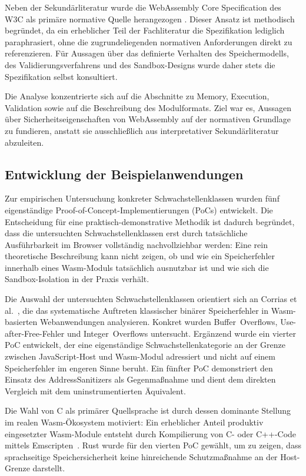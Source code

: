 Neben der Sekundärliteratur wurde die WebAssembly Core Specification des W3C als primäre normative Quelle herangezogen \cite{wasmcoreW3C}. Dieser Ansatz ist methodisch begründet, da ein erheblicher Teil der Fachliteratur die Spezifikation lediglich paraphrasiert, ohne die zugrundeliegenden normativen Anforderungen direkt zu referenzieren. Für Aussagen über das definierte Verhalten des Speichermodells, des Validierungsverfahrens und des Sandbox-Designs wurde daher stets die Spezifikation selbst konsultiert.

Die Analyse konzentrierte sich auf die Abschnitte zu Memory, Execution, Validation sowie auf die Beschreibung des Modulformats. Ziel war es, Aussagen über Sicherheitseigenschaften von WebAssembly auf der normativen Grundlage zu fundieren, anstatt sie ausschließlich aus interpretativer Sekundärliteratur abzuleiten.

\subsection{Entwicklung der Beispielanwendungen}

Zur empirischen Untersuchung konkreter Schwachstellenklassen wurden fünf eigenständige Proof-of-Concept-Implementierungen (PoCs) entwickelt. Die Entscheidung für eine praktisch-demonstrative Methodik ist dadurch begründet, dass die untersuchten Schwachstellenklassen erst durch tatsächliche Ausführbarkeit im Browser vollständig nachvollziehbar werden: Eine rein theoretische Beschreibung kann nicht zeigen, ob und wie ein Speicherfehler innerhalb eines Wasm-Moduls tatsächlich ausnutzbar ist und wie sich die Sandbox-Isolation in der Praxis verhält.

Die Auswahl der untersuchten Schwachstellenklassen orientiert sich an Corrias et al.~\cite{corrias2026analysis}, die das systematische Auftreten klassischer binärer Speicherfehler in Wasm-basierten Webanwendungen analysieren. Konkret wurden Buffer~Overflows, Use-after-Free-Fehler und Integer~Overflows untersucht. Ergänzend wurde ein vierter PoC entwickelt, der eine eigenständige Schwachstellenkategorie an der Grenze zwischen JavaScript-Host und Wasm-Modul adressiert und nicht auf einem Speicherfehler im engeren Sinne beruht. Ein fünfter PoC demonstriert den Einsatz des AddressSanitizers als Gegenmaßnahme und dient dem direkten Vergleich mit dem uninstrumentierten Äquivalent.

Die Wahl von C als primärer Quellsprache ist durch dessen dominante Stellung im realen Wasm-Ökosystem motiviert: Ein erheblicher Anteil produktiv eingesetzter Wasm-Module entsteht durch Kompilierung von C- oder C++-Code mittels Emscripten~\cite{emscripten}. Rust wurde für den vierten PoC gewählt, um zu zeigen, dass sprachseitige Speichersicherheit keine hinreichende Schutzmaßnahme an der Host-Grenze darstellt.


